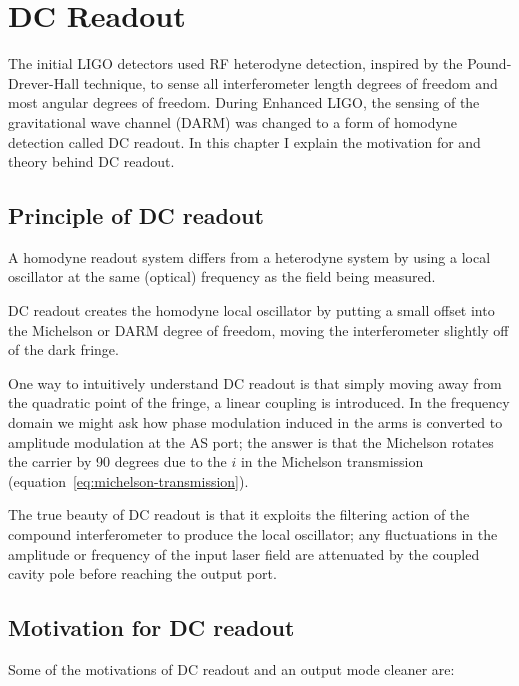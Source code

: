 \chapter{DC Readout}
\label{chapter3}

The initial LIGO detectors used RF heterodyne detection, inspired by
the Pound-Drever-Hall technique, to sense all interferometer length
degrees of freedom and most angular degrees of freedom.  During
Enhanced LIGO, the sensing of the gravitational wave channel (DARM)
was changed to a form of homodyne detection called DC readout.  In
this chapter I explain the motivation for and theory behind DC
readout.

\section{Principle of DC readout}
A homodyne readout system differs from a heterodyne system by using a
local oscillator at the same (optical) frequency as the field being measured.

DC readout creates the homodyne local oscillator by putting a small
offset into the Michelson or DARM degree of freedom, moving the
interferometer slightly off of the dark fringe.

One way to intuitively understand DC readout is that simply moving
away from the quadratic point of the fringe, a linear coupling is
introduced.  In the frequency domain we might ask how phase modulation
induced in the arms is converted to amplitude modulation at the AS
port; the answer is that the Michelson rotates the carrier by 90
degrees due to the $i$ in the Michelson transmission
(equation~\ref{eq:michelson-transmission}).

The true beauty of DC readout is that it exploits the filtering
action of the compound interferometer to produce the local oscillator;
any fluctuations in the amplitude or frequency of the input laser
field are attenuated by the coupled cavity pole before reaching the
output port.

\section{Motivation for DC readout}

Some of the motivations of DC readout and an output mode cleaner are:

